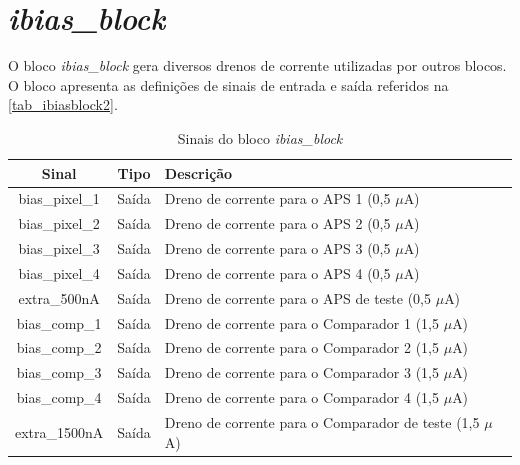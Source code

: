 \renewcommand{\NomeBloco}{\emph{ibias\_block}}
\renewcommand{\NomeBlocoA}{ibiasblock}
\renewcommand{\NomePTab}{tab_\NomeBlocoA}
\renewcommand{\NomeSTab}{tab_\NomeBlocoA2}
\renewcommand{\NomePFig}{fig_\NomeBlocoA}
\renewcommand{\NomeSFig}{fig_\NomeBlocoA2}
\renewcommand{\NomeTTab}{tab_\NomeBlocoA3}

\section{\NomeBloco}

O bloco \NomeBloco{} gera diversos drenos de corrente utilizadas por outros blocos. O bloco apresenta as defini{\c c}\~oes de sinais de entrada e sa\'ida referidos na \autoref{\NomeSTab}.

\begin{table}[htbp]
\caption{Sinais do bloco \NomeBloco}
\label{\NomeSTab}
\centering
\begin{tabular}{ccl}

    \toprule
    Sinal & Tipo    & Descri{\c c}\~ao      \\
    \midrule \midrule
    bias\_pixel\_1   & Sa\'ida   & Dreno de corrente para o APS 1 (0,5 $\mu$A) \\
    \midrule
    bias\_pixel\_2   & Sa\'ida   & Dreno de corrente para o APS 2 (0,5 $\mu$A) \\
    \midrule
    bias\_pixel\_3   & Sa\'ida   & Dreno de corrente para o APS 3 (0,5 $\mu$A) \\
    \midrule
    bias\_pixel\_4   & Sa\'ida   & Dreno de corrente para o APS 4 (0,5 $\mu$A) \ \\
    extra\_500nA   & Sa\'ida   & Dreno de corrente para o APS de teste (0,5 $\mu$A) \ \\
    \midrule
    bias\_comp\_1   & Sa\'ida   & Dreno de corrente para o Comparador 1 (1,5 $\mu$A) \ \\
    \midrule
    bias\_comp\_2   & Sa\'ida   & Dreno de corrente para o Comparador 2 (1,5 $\mu$A) \ \\
    \midrule
    bias\_comp\_3   & Sa\'ida   & Dreno de corrente para o Comparador 3 (1,5 $\mu$A) \\
    \midrule
    bias\_comp\_4   & Sa\'ida   & Dreno de corrente para o Comparador 4 (1,5 $\mu$A) \\
    extra\_1500nA   & Sa\'ida   & Dreno de corrente para o Comparador de teste (1,5 $\mu$A) \ \\
    \bottomrule
\end{tabular}
\end{table}

